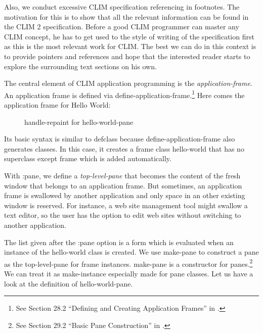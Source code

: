 \documentclass[twocolumn,a4paper]{article}
\newcommand {\concept} [1] {{\sl #1}\index{#1}}
\newcommand {\code}[1]{{\sffamily #1}}
\newcommand {\CLIM}{{\small CLIM}}
\let\class\code
\let\method\code
\let\keyword\code
\begin{document}
Also, we conduct excessive \CLIM{} specification referencing in
footnotes. The motivation for this is to show that all the relevant
information can be found in the \CLIM{} 2
specification\cite{clim-spec}. Before a good \CLIM{} programmer can
master any \CLIM{} concept, he has to get used to the style of writing
of the specification first as this is the most relevant work for
\CLIM{}. The best we can do in this context is to provide pointers and
references and hope that the interested reader starts to explore the
surrounding text sections on his own.

The central element of \CLIM{} application programming is the
\concept{application-frame}. An application frame is defined via
\code{define-application-frame}.\footnote{See Section 28.2 ``Defining
  and Creating Application Frames'' in \cite{clim-spec}.} Here comes
the application frame for Hello World:
\lstset{style=inlinestyle}


\begin{figure*}
\lstset{style=framestyle}

\caption{\method{handle-repaint} for \class{hello-world-pane}}\label{hello-world-repaint}
\end{figure*}
Its basic syntax is similar to \code{defclass} because
\code{define-application-frame} also generates classes. In this case,
it creates a frame class \class{hello-world} that has no superclass
except \class{frame} which is added automatically.

With \code{:pane}, we define a \concept{top-level-pane} that becomes
the content of the fresh window that belongs to an application
frame. But sometimes, an application frame is swallowed by another
application and only space in an other existing window is
reserved. For instance, a web site management tool might swallow a
text editor, so the user has the option to edit web sites without
switching to another application.


The list given after the \keyword{:pane} option is a form which is
evaluated when an instance of the \class{hello-world} class is
created. We use \method{make-pane} to construct a pane as the
top-level-pane for frame instances. \method{make-pane} is a
constructor for panes.\footnote{See Section 29.2 ``Basic Pane
  Construction'' in \cite{clim-spec}.} We can treat it as
\code{make-instance} especially made for pane classes.  Let us have a
look at the definition of \class{hello-world-pane}.
\end{document}
